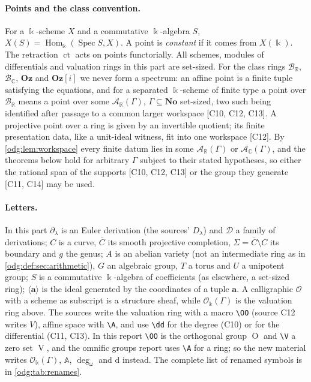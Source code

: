 \documentclass[11pt,oneside]{article}
\numberwithin{equation}{section}
\theoremstyle{definition}
\theoremstyle{remark}
\newcommand{\No}{\mathbf{No}}
\newcommand{\Oz}{\mathbf{Oz}}
\newcommand{\R}{\mathbb R}
\newcommand{\C}{\mathbb C}
\newcommand{\BR}{\mathcal B_{\R}}
\newcommand{\BC}{\mathcal B_{\C}}
\newcommand{\ct}{\operatorname{ct}}
\newcommand{\ddeg}{\operatorname{deg}_{\omega}}
\newcommand{\OO}{\operatorname O}
\newcommand{\V}{\operatorname V}
\newcommand{\src}[1]{\textup{\textsf{\small[#1]}}}
\newcommand{\Og}{\Oz[i]}
\newcommand{\crO}{\mathcal O_\Bbbk(\Gamma)}
\newcommand{\Aff}{\mathbb A}
\newcommand{\Spec}{\operatorname{Spec}}
\newcommand{\Hom}{\operatorname{Hom}}
\newcommand{\dif}{\mathrm d}
\begin{document}
\paragraph{Points and the class convention.} For a $\Bbbk$-scheme $X$ and a
commutative $\Bbbk$-algebra $S$, $X(S)=\Hom_\Bbbk(\Spec S,X)$. A point is
\emph{constant} if it comes from $X(\Bbbk)$. The retraction $\ct$ acts on points
functorially. All schemes, modules of differentials and valuation rings in this
part are set-sized. For the class rings $\BR$, $\BC$, $\Oz$ and $\Og$ we never
form a spectrum: an affine point is a finite tuple satisfying the equations,
and for a separated $\Bbbk$-scheme of finite type a point over $\BR$ means a point
over some $\mathcal A_\R(\Gamma)$, $\Gamma\subseteq\No$ set-sized, two such being
identified after passage to a common larger workspace \src{C10, C12, C13}. A
projective point over a ring is given by an invertible quotient; its finite
presentation data, like a unit-ideal witness, fit into one workspace \src{C12}.
By \cref{odg:lem:workspace} every finite datum lies in some $\mathcal A_\R(\Gamma)$
or $\mathcal A_\C(\Gamma)$, and the theorems below hold for arbitrary $\Gamma$
subject to their stated hypotheses, so
either the rational span of the supports \src{C10, C12, C13} or the group they
generate \src{C11, C14} may be used.

\paragraph{Letters.} In this part $\partial_\lambda$ is an Euler derivation (the
sources' $D_\lambda$) and $\mathcal D$ a family of derivations; $C$ is a curve,
$\overline C$ its smooth projective completion, $\Sigma=\overline C\setminus C$ its
boundary and $g$ the genus; $A$ is an abelian variety (not an intermediate ring
as in \cref{odg:def:sec:arithmetic}), $G$ an algebraic group, $T$ a torus and $U$
a unipotent group; $S$ is a commutative $\Bbbk$-algebra of coefficients (as
elsewhere, a set-sized ring); $\langle\mathbf a\rangle$ is the ideal generated by
the coordinates of a tuple $\mathbf a$. A calligraphic $\mathcal O$ with a scheme
as subscript is a structure sheaf, while $\crO$ is the valuation ring above. The
sources write the valuation ring with a macro \texttt{\textbackslash OO} (source C12
writes $V$), affine space with \texttt{\textbackslash A}, and use
\texttt{\textbackslash dd} for the degree (C10) or for the differential (C11, C13).
In this report \texttt{\textbackslash OO} is the orthogonal group
$\OO$ and \texttt{\textbackslash V} a zero set $\V$, and the omnific groups report
uses \texttt{\textbackslash A} for a ring; so the new material writes $\crO$,
$\Aff$, $\ddeg$ and $\dif$ instead. The complete list of renamed symbols is in
\cref{odg:tab:renames}.
\end{document}

